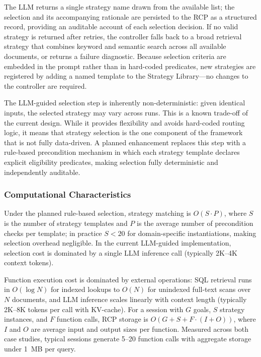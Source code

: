 \documentclass[largeformat]{interact}
\begin{document}
\noindent The LLM returns a single strategy name drawn from the available list; the selection and its accompanying rationale are persisted to the RCP as a structured record, providing an auditable account of each selection decision. If no valid strategy is returned after retries, the controller falls back to a broad retrieval strategy that combines keyword and semantic search across all available documents, or returns a failure diagnostic. Because selection criteria are embedded in the prompt rather than in hard-coded predicates, new strategies are registered by adding a named template to the Strategy Library---no changes to the controller are required.
 
The LLM-guided selection step is inherently non-deterministic: given identical inputs, the selected strategy may vary across runs. This is a known trade-off of the current design. While it provides flexibility and avoids hard-coded routing logic, it means that strategy selection is the one component of the framework that is not fully data-driven. A planned enhancement replaces this step with a rule-based precondition mechanism in which each strategy template declares explicit eligibility predicates, making selection fully deterministic and independently auditable.

\subsubsection{Computational Characteristics}
\label{subsubsec:computational_characteristics}
Under the planned rule-based selection, strategy matching is $O(S \cdot P)$, where $S$ is the number of strategy templates and $P$ is the average number of precondition checks per template; in practice $S < 20$ for domain-specific instantiations, making selection overhead negligible. In the current LLM-guided implementation, selection cost is dominated by a single LLM inference call (typically 2K--4K context tokens).
 
Function execution cost is dominated by external operations: SQL retrieval runs in $O(\log N)$ for indexed lookups to $O(N)$ for unindexed full-text scans over $N$ documents, and LLM inference scales linearly with context length (typically 2K--8K tokens per call with KV-cache). For a session with $G$ goals, $S$ strategy instances, and $F$ function calls, RCP storage is $O(G + S + F \cdot (I + O))$, where $I$ and $O$ are average input and output sizes per function. Measured across both case studies, typical sessions generate 5--20 function calls with aggregate storage under 1~MB per query.
\end{document}

